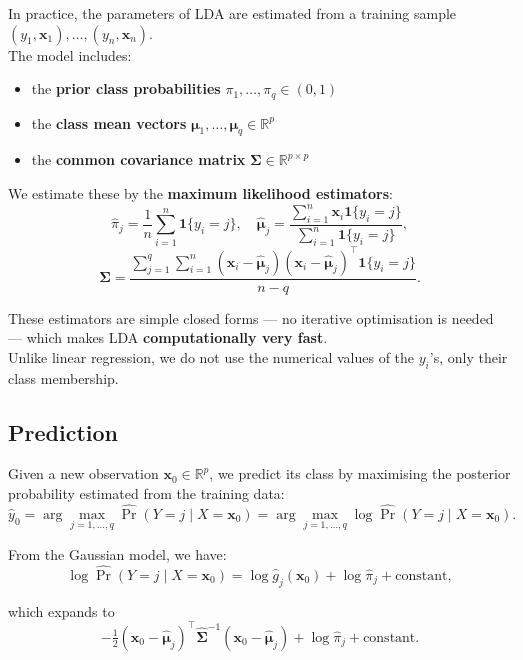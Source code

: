 \documentclass[
  letterpaper,
  DIV=11,
  numbers=noendperiod]{scrartcl}
\providecommand{\tightlist}{%
  \setlength{\itemsep}{0pt}\setlength{\parskip}{0pt}}\usepackage{longtable,booktabs,array}
\begin{document}
In practice, the parameters of LDA are estimated from a training sample
\((y_1, \mathbf{x}_1), \ldots, (y_n, \mathbf{x}_n)\).\\
The model includes:

\begin{itemize}
\tightlist
\item
  the \textbf{prior class probabilities}
  \(\pi_1, \ldots, \pi_q \in (0, 1)\)\\
\item
  the \textbf{class mean vectors}
  \(\boldsymbol{\mu}_1, \ldots, \boldsymbol{\mu}_q \in \mathbb{R}^p\)\\
\item
  the \textbf{common covariance matrix}
  \(\boldsymbol{\Sigma} \in \mathbb{R}^{p \times p}\)
\end{itemize}

We estimate these by the \textbf{maximum likelihood estimators}:
\[\hat{\pi}_j = \frac{1}{n} \sum_{i=1}^{n} \mathbf{1}\{y_i = j\}, \quad \hat{\boldsymbol{\mu}}_j = \frac{\sum_{i=1}^{n} \mathbf{x}_i \mathbf{1}\{y_i = j\}}{\sum_{i=1}^{n} \mathbf{1}\{y_i = j\}}, \]
\[\hat{\boldsymbol{\Sigma}} = \frac{\sum_{j=1}^{q} \sum_{i=1}^{n} (\mathbf{x}_i - \hat{\boldsymbol{\mu}}_j)(\mathbf{x}_i - \hat{\boldsymbol{\mu}}_j)^{\top} \mathbf{1}\{y_i = j\}}{n - q}.\]

These estimators are simple closed forms --- no iterative optimisation
is needed --- which makes LDA \textbf{computationally very fast}.\\
Unlike linear regression, we do not use the numerical values of the
\(y_i\)'s, only their class membership.

\subsection{Prediction}\label{prediction}

Given a new observation \(\mathbf{x}_0 \in \mathbb{R}^p\), we predict
its class by maximising the posterior probability estimated from the
training data:
\[\hat{y}_0 = \arg\max_{j=1,\ldots,q} \widehat{\Pr}(Y = j \mid X = \mathbf{x}_0) = \arg\max_{j=1,\ldots,q} \log \widehat{\Pr}(Y = j \mid X = \mathbf{x}_0).\]

From the Gaussian model, we have:
\[\log \widehat{\Pr}(Y = j \mid X = \mathbf{x}_0) = \log \hat{g}_j(\mathbf{x}_0) + \log \hat{\pi}_j + \text{constant},\]

which expands to
\[-\tfrac{1}{2}(\mathbf{x}_0 - \hat{\boldsymbol{\mu}}_j)^{\top} \hat{\boldsymbol{\Sigma}}^{-1} (\mathbf{x}_0 - \hat{\boldsymbol{\mu}}_j) + \log \hat{\pi}_j + \text{constant}.\]
\end{document}
